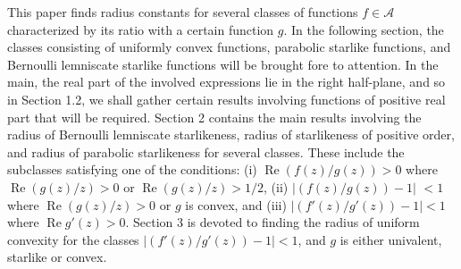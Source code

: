 \documentclass{amsart}
\begin{document}
This paper finds radius constants for several classes of functions $f\in \mathcal{A}$ characterized by its ratio with a certain function $g$. In the following section, the classes consisting of uniformly convex functions, parabolic starlike functions, and Bernoulli lemniscate starlike functions will be brought fore to attention. In the main, the real part of the involved expressions lie in the right half-plane, and so in Section 1.2, we shall gather certain results involving functions of positive real part that will be required. Section 2 contains the main results involving the radius of Bernoulli lemniscate starlikeness, radius of starlikeness of positive order, and radius of parabolic starlikeness for several classes. These include the subclasses satisfying one of the conditions: (i)  $\operatorname{Re}(f(z)/g(z))>0$ where $\operatorname{Re} (g(z)/z)>0$ or $\operatorname{Re}(g(z)/z)>1/2$, (ii) $ \left|(f(z)/g(z))-1\right|$ $<1$ where $\operatorname{Re}(g(z)/z)>0$ or $g$ is convex, and (iii)  $ \left|(f'(z)/g'(z))-1\right|<1$  where $\operatorname{Re} g'(z)>0$. Section 3 is devoted to finding the radius of uniform convexity for the classes $ \left|(f'(z)/g'(z))-1\right|<1$, and $g$ is either univalent, starlike or convex.
\end{document}
